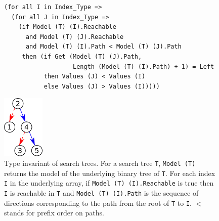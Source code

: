 \documentclass{llncs}
\begin{document}

\vspace{-1cm}
\begin{figure}[ht]
\hspace{-3mm}
\begin{minipage}[c]{.79\linewidth}
\begin{small}
\begin{lstlisting}
(for all I in Index_Type =>
  (for all J in Index_Type =>
    (if Model (T) (I).Reachable
      and Model (T) (J).Reachable
      and Model (T) (I).Path < Model (T) (J).Path
     then (if Get (Model (T) (J).Path,
                   Length (Model (T) (I).Path) + 1) = Left
           then Values (J) < Values (I)
           else Values (J) > Values (I)))))
\end{lstlisting}
\end{small}
\end{minipage}
\begin{minipage}[c]{.22\linewidth}
\begin{center}
\includegraphics[width=2cm]{search.pdf}
\end{center}
\end{minipage}
\caption{\label{fig-search} Type invariant of search trees. For a search tree \texttt{T},
\texttt{Model (T)} returns the model of the underlying binary tree of \texttt{T}.
For each index \texttt{I} in the underlying
array, if \texttt{Model (T) (I).Reachable} is true then \texttt{I} is reachable
in \texttt{T} and \texttt{Model (T) (I).Path} is the sequence
of directions corresponding to the path from the root of \texttt{T} to \texttt{I}.
$<$ stands for prefix order on paths.}
\vspace{-0.5cm}
\end{figure}
\end{document}
